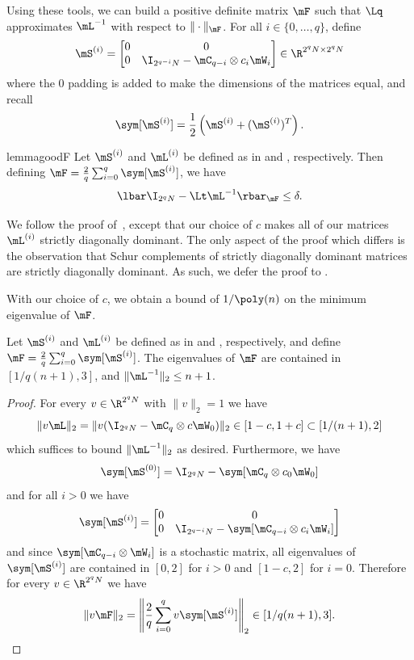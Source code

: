 Using these tools, we can build a positive definite matrix $\mF$ such that $\Lq$ approximates $\mL^{-1}$ with respect to $\|\cdot\|_{\mF}$.
For all $i\in \{0,\ldots,q\}$, define 
\begin{equation}
    \mS^{(i)}=\begin{bmatrix}0 & 0\\ 0 & \I_{2^{q-i}N}-\mC_{q-i}\otimes c_{i}\mW_i \end{bmatrix} \in \R^{2^qN\times 2^qN}\label{eqn:Sdecomp}
\end{equation}
where the $0$ padding is added to make the dimensions of the matrices equal, and recall
\[\sym[\mS^{(i)}] = \frac{1}{2}\left(\mS^{(i)}+(\mS^{(i)})^T\right).\]

\begin{restatable}{lemma}{goodF}\label{lem:goodF}
Let $\mS^{(i)}$ and $\mL^{(i)}$ be defined as in  and , respectively. %
Then defining
$\mF=\frac{2}{q}\sum_{i=0}^q\sym[\mS^{(i)}]$, we have %
$$\lbar \I_{2^qN}-\Lt\mL^{-1}\rbar_\mF\leq \delta.$$
\end{restatable}
We follow the proof of~\cite{AhmadinejadKeMuPeSiVa19}, except that our choice of $c$ makes all of our matrices $\mL^{(i)}$ %
strictly diagonally dominant. The only aspect of the proof which differs is the observation that Schur complements of strictly diagonally dominant matrices are strictly diagonally dominant. As such, we defer the proof to .

With our choice of $c$, we obtain a bound of $1/\poly(n)$ on the minimum eigenvalue of $\mF$.
\begin{lemma}\label{lem:condF}
Let $\mS^{(i)}$ and $\mL^{(i)}$ be defined as in  and , respectively, %
and define
$\mF=\frac{2}{q}\sum_{i=0}^q\sym[\mS^{(i)}]$. The eigenvalues of $\mF$ are contained in $[1/q(n+1),3]$, and $\|\mL^{-1}\|_2\leq n+1$.
\end{lemma}
\begin{proof}
For every $v \in \R^{2^qN}$ with $\|v\|_2=1$ we have  
\[\|v\mL\|_2=\|v(\I_{2^qN}- \mC_q\otimes c\mW_0)\|_2 \in [1-c,1+c]\subset[1/(n+1),2]\]
which suffices to bound $\|\mL^{-1}\|_2$ as desired. Furthermore, we have
\[\sym[\mS^{(0)}]=\I_{2^{q}N}-\sym[\mC_{q}\otimes c_{0}\mW_0]\]
and for all $i>0$ we have
\[\sym[\mS^{(i)}]=\begin{bmatrix}0 & 0\\ 0 & \I_{2^{q-i}N}-\sym[\mC_{q-i}\otimes c_{i}\mW_i] \end{bmatrix}\]
and since $\sym[\mC_{q-i}\otimes \mW_i]$ is a stochastic matrix, all eigenvalues of $\sym[\mS^{(i)}]$ are contained in $[0,2]$ for $i>0$ and $[1-c,2]$ for $i=0$. Therefore for every $v\in \R^{2^qN}$ we have
\[\|v\mF\|_2=\left\|\frac{2}{q}\sum_{i=0}^q v\sym[\mS^{(i)}]\right\|_2 \in [1/q(n+1),3]. \qedhere\] 
\end{proof}

